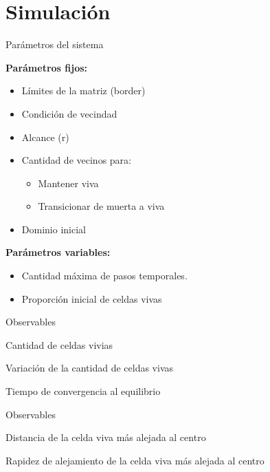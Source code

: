 \section{Simulación}

\begin{frame}{Parámetros del sistema}
    \begin{minipage}[t]{0.45\linewidth}

        {\textbf{Parámetros fijos:}
        \begin{itemize}
            \item Límites de la matriz (border)
            \item Condición de vecindad
            \item Alcance (r)
            \item Cantidad de vecinos para:
            \begin{itemize}
                \item Mantener viva
                \item Transicionar de muerta a viva
            \end{itemize}
            \item Dominio inicial
        \end{itemize}}
    \end{minipage}
    \begin{minipage}[t]{0.45\linewidth}
        \textbf{Parámetros variables:}
        \begin{itemize}
            \item Cantidad máxima de pasos temporales.
            \item Proporción inicial de celdas vivas
        \end{itemize}

    \end{minipage}
\end{frame}

\begin{frame}{Observables}

    \begin{block}{Cantidad de celdas vivias}

    \end{block}

    \begin{block}{Variación de la cantidad de celdas vivas}

    \end{block}

    \begin{block}{Tiempo de convergencia al equilibrio}

    \end{block}


\end{frame}

\begin{frame}{Observables}

    \begin{block}{Distancia de la celda viva más alejada al centro}

    \end{block}

    \begin{block}{Rapidez de alejamiento de la celda viva más alejada al centro}

    \end{block}


\end{frame}
